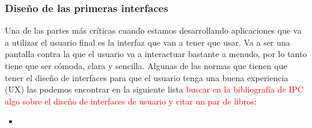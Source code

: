 \subsubsection{Diseño de las primeras interfaces}

Una de las partes más críticas cuando estamos desarrollando aplicaciones que va a utilizar el usuario final es la interfaz que van a tener que usar. Va a ser una pantalla contra la que el usuario va a interactuar bastante a menudo, por lo tanto tiene que ser cómoda, clara y sencilla. Algunas de las normas que tienen que tener el diseño de interfaces para que el usuario tenga una buena experiencia (UX) las podemos encontrar en la siguiente lista \textcolor{red}{buscar en la bibliografía de IPC algo sobre el diseño de interfaces de usuario y citar un par de libros}: 
\begin{itemize}
   \item 
\end{itemize}